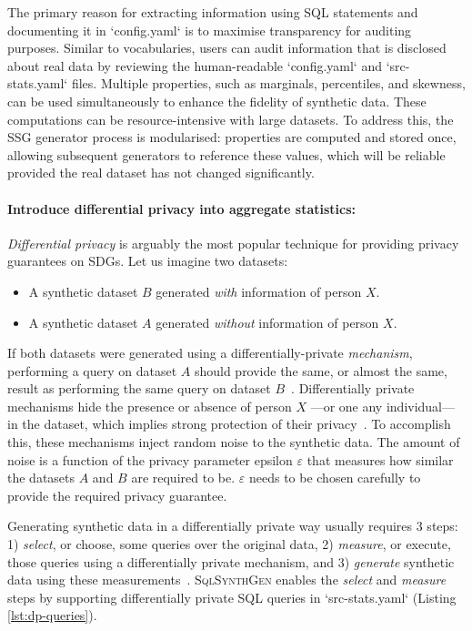 \documentclass[11pt]{article}
\begin{document}
The primary reason for extracting information using SQL statements and documenting it in `config.yaml` is to maximise transparency for auditing purposes. Similar to vocabularies, users can audit information that is disclosed about real data by reviewing the human-readable `config.yaml` and `src-stats.yaml` files. Multiple properties, such as marginals, percentiles, and skewness, can be used simultaneously to enhance the fidelity of synthetic data. These computations can be resource-intensive with large datasets. To address this, the SSG generator process is modularised: properties are computed and stored once, allowing subsequent generators to  reference these values, which will be reliable provided the real dataset has not changed significantly.

\paragraph{Introduce differential privacy into aggregate statistics:}

\emph{Differential privacy} is arguably the most popular technique for providing privacy guarantees on SDGs.
Let us imagine two datasets:

\begin{itemize}
    \item A synthetic dataset $B$ generated \emph{with} information of person $X$.
    \item A synthetic dataset $A$ generated \emph{without} information of person $X$.
\end{itemize}

If both datasets were generated using a differentially-private \emph{mechanism}, performing a query on dataset $A$ should provide the same, or almost the same, result as performing the same query on dataset $B$~\cite{Kopp2021MicrosoftSD}.
Differentially private mechanisms hide the presence or absence of person $X$ ---or one any individual--- in the dataset, which implies strong protection of their privacy~\cite{near2021}.
To accomplish this, these mechanisms inject random noise to the synthetic data.
The amount of noise is a function of the privacy parameter epsilon $\varepsilon$ that measures how similar the datasets $A$ and $B$ are required to be. $\varepsilon$ needs to be chosen carefully to provide the required privacy guarantee.

Generating synthetic data in a differentially private way usually requires 3 steps: 1) \emph{select}, or choose, some queries over the original data, 2) \emph{measure}, or execute, those queries using a differentially private mechanism, and 3) \emph{generate} synthetic data using these measurements~\cite{DBLP:journals/pvldb/McKennaMSM22}.
\textsc{SqlSynthGen} enables the \emph{select} and \emph{measure} steps by supporting differentially private SQL queries in `src-stats.yaml`  (Listing \ref{lst:dp-queries}).
\end{document}
